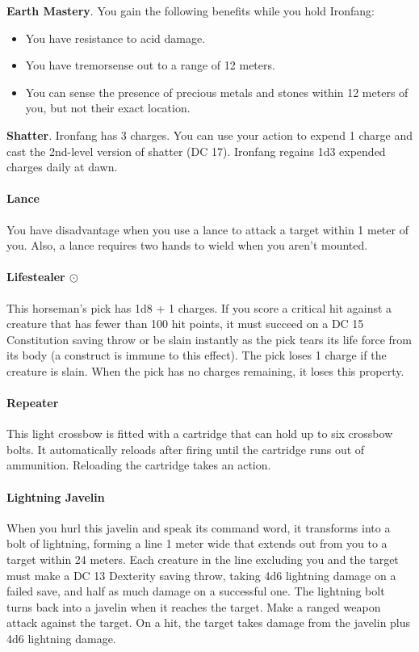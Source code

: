        \textbf{Earth Mastery}.
        You gain the following benefits while you hold Ironfang:
        \begin{itemize}
            \item You have resistance to acid damage.
            \item You have tremorsense out to a range of 12 meters.
            \item You can sense the presence of precious metals and stones within 12 meters of you, but not their exact location.
        \end{itemize}

        \textbf{Shatter}.
        Ironfang has 3 charges.
        You can use your action to expend 1 charge and cast the 2nd-level version of shatter (DC 17).
        Ironfang regains 1d3 expended charges daily at dawn.
    \paragraph{Lance}
        You have disadvantage when you use a lance to attack a target within 1 meter of you.
        Also, a lance requires two hands to wield when you aren't mounted.
    \paragraph{Lifestealer $\odot$}
        This horseman's pick has 1d8 + 1 charges.
        If you score a critical hit against a creature that has fewer than 100 hit points, it must succeed on a DC 15 Constitution saving throw or be slain instantly as the pick tears its life force from its body (a construct is immune to this effect).
        The pick loses 1 charge if the creature is slain.
        When the pick has no charges remaining, it loses this property.
    \paragraph{Repeater}
        This light crossbow is fitted with a cartridge that can hold up to six crossbow bolts.
        It automatically reloads after firing until the cartridge runs out of ammunition.
        Reloading the cartridge takes an action.
    \paragraph{Lightning Javelin}
        When you hurl this javelin and speak its command word, it transforms into a bolt of lightning, forming a line 1 meter wide that extends out from you to a target within 24 meters.
        Each creature in the line excluding you and the target must make a DC 13 Dexterity saving throw, taking 4d6 lightning damage on a failed save, and half as much damage on a successful one.
        The lightning bolt turns back into a javelin when it reaches the target.
        Make a ranged weapon attack against the target.
        On a hit, the target takes damage from the javelin plus 4d6 lightning damage.

